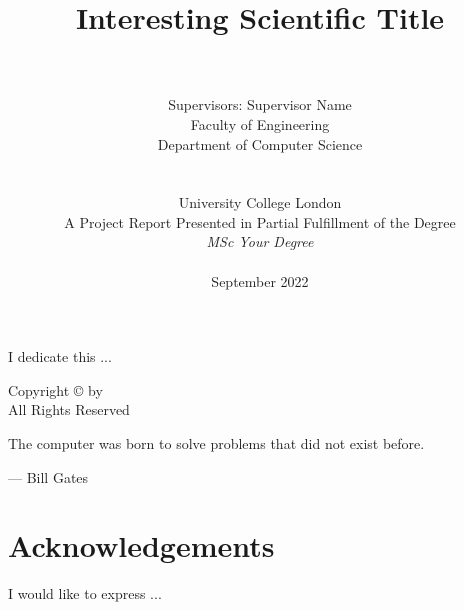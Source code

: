 \documentclass[12pt, a4paper]{report}
\date{}
\title{Interesting Scientific Title}
\author{\\ \Large{\YourName}
\\ Supervisors: Supervisor Name
\\ Faculty of Engineering
\\ Department of Computer Science
\\ 
\\
\\ University College London
\\
A Project Report Presented in Partial Fulfillment of the Degree \\ \textit{MSc Your Degree}
\\ \\
September 2022
}
\begin{document}
      

\thispagestyle{headings}
\maketitle
\FloatBarrier
{}

\newpage
\thispagestyle{empty}
\begin{center}
I dedicate this ...
\end{center}

\newpage
\thispagestyle{empty}
\vspace*{\fill}
\begin{center}
Copyright \copyright  {} by \YourName \\ All Rights Reserved
\end{center}
\vspace*{\fill}
\newpage
\thispagestyle{empty}
\epigraph{The computer was born to solve problems that did not exist before.}{--- \textup{Bill Gates}}

\thispagestyle{empty}
\chapter*{Acknowledgements}
I would like to express ...
\end{document}
